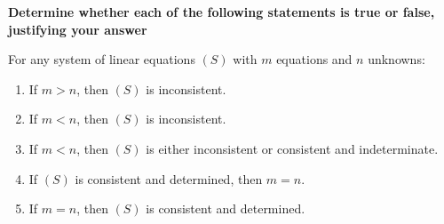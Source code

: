 
\item \textbf{Determine whether each of
the following statements is true or false,
justifying your answer}

For any system of linear equations $(S)$
with $m$ equations and $n$ unknowns:

\begin{enumerate}[label=\alph*)]

    \item If $m>n$, then $(S)$
    is inconsistent.

    \begin{answer}
    \end{answer}

    \item If $m<n$, then $(S)$
    is inconsistent.

    \begin{answer}
    \end{answer}

    \item If $m<n$, then $(S)$ is either
    inconsistent or consistent and
    indeterminate.

    \begin{answer}
    \end{answer}

    \item If $(S)$ is consistent and
    determined, then $m=n$.

    \begin{answer}
    \end{answer}

    \item If $m=n$, then $(S)$ is
    consistent and determined.

    \begin{answer}
    \end{answer}

\end{enumerate}

